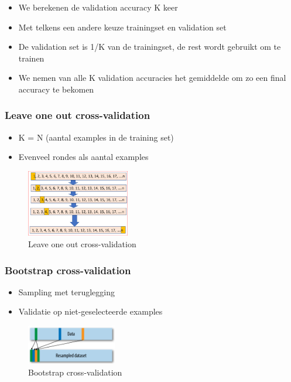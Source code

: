 \documentclass{article}
\begin{document}
\begin{itemize}
    \item We berekenen de validation accuracy K keer
    \item Met telkens een andere keuze trainingset en validation set
    \item De validation set is 1/K van de trainingset, de rest wordt gebruikt om te trainen
    \item We nemen van alle K validation accuracies het gemiddelde om zo een final accuracy te bekomen
\end{itemize}

\subsubsection{Leave one out cross-validation}

\begin{itemize}
    \item K = N (aantal examples in de training set)
    \item Evenveel rondes als aantal examples
\end{itemize}

\begin{figure}[H]
    \centering
    \includegraphics[width=0.4\textwidth]{cross-validation-leaveoneout.png}
    \caption{Leave one out cross-validation}
\end{figure}

\subsubsection{Bootstrap cross-validation}

\begin{itemize}
    \item Sampling met teruglegging
    \item Validatie op niet-geselecteerde examples
\end{itemize}

\begin{figure}[H]
    \centering
    \includegraphics[width=0.35\textwidth]{cross-validation-bootstrap.png}
    \caption{Bootstrap cross-validation}
\end{figure}
\end{document}
